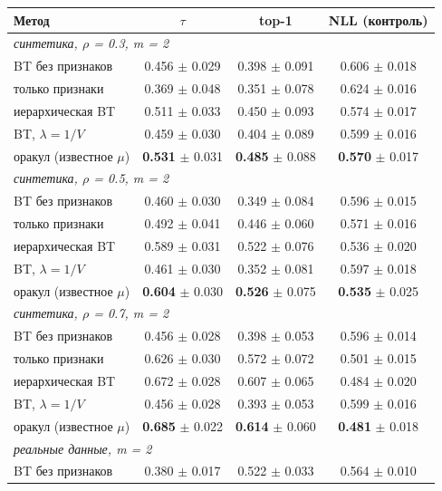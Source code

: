 \begin{tabular}{lccc}
\toprule
Метод & $\tau$ & top-1 & NLL (контроль) \\
\midrule
\multicolumn{4}{l}{\textit{синтетика, $\rho$ = 0.3, m = 2}} \\
BT без признаков & 0.456 $\pm$ 0.029 & 0.398 $\pm$ 0.091 & 0.606 $\pm$ 0.018 \\
только признаки & 0.369 $\pm$ 0.048 & 0.351 $\pm$ 0.078 & 0.624 $\pm$ 0.016 \\
иерархическая BT & 0.511 $\pm$ 0.033 & 0.450 $\pm$ 0.093 & 0.574 $\pm$ 0.017 \\
BT, $\lambda = 1/V$ & 0.459 $\pm$ 0.030 & 0.404 $\pm$ 0.089 & 0.599 $\pm$ 0.016 \\
оракул (известное $\mu$) & \textbf{0.531} $\pm$ 0.031 & \textbf{0.485} $\pm$ 0.088 & \textbf{0.570} $\pm$ 0.017 \\
\midrule
\multicolumn{4}{l}{\textit{синтетика, $\rho$ = 0.5, m = 2}} \\
BT без признаков & 0.460 $\pm$ 0.030 & 0.349 $\pm$ 0.084 & 0.596 $\pm$ 0.015 \\
только признаки & 0.492 $\pm$ 0.041 & 0.446 $\pm$ 0.060 & 0.571 $\pm$ 0.016 \\
иерархическая BT & 0.589 $\pm$ 0.031 & 0.522 $\pm$ 0.076 & 0.536 $\pm$ 0.020 \\
BT, $\lambda = 1/V$ & 0.461 $\pm$ 0.030 & 0.352 $\pm$ 0.081 & 0.597 $\pm$ 0.018 \\
оракул (известное $\mu$) & \textbf{0.604} $\pm$ 0.030 & \textbf{0.526} $\pm$ 0.075 & \textbf{0.535} $\pm$ 0.025 \\
\midrule
\multicolumn{4}{l}{\textit{синтетика, $\rho$ = 0.7, m = 2}} \\
BT без признаков & 0.456 $\pm$ 0.028 & 0.398 $\pm$ 0.053 & 0.596 $\pm$ 0.014 \\
только признаки & 0.626 $\pm$ 0.030 & 0.572 $\pm$ 0.072 & 0.501 $\pm$ 0.015 \\
иерархическая BT & 0.672 $\pm$ 0.028 & 0.607 $\pm$ 0.065 & 0.484 $\pm$ 0.020 \\
BT, $\lambda = 1/V$ & 0.456 $\pm$ 0.028 & 0.393 $\pm$ 0.053 & 0.599 $\pm$ 0.016 \\
оракул (известное $\mu$) & \textbf{0.685} $\pm$ 0.022 & \textbf{0.614} $\pm$ 0.060 & \textbf{0.481} $\pm$ 0.018 \\
\midrule
\multicolumn{4}{l}{\textit{реальные данные, m = 2}} \\
BT без признаков & 0.380 $\pm$ 0.017 & 0.522 $\pm$ 0.033 & 0.564 $\pm$ 0.010 \\

\end{tabular}
